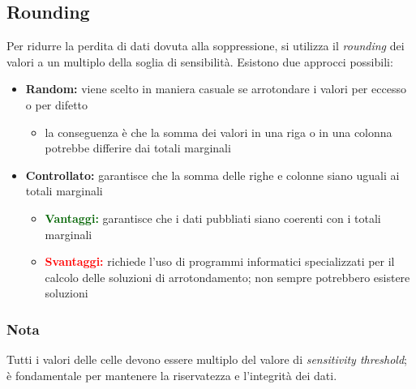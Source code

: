 \documentclass{report}
\begin{document}
\subsection{Rounding}
Per ridurre la perdita di dati dovuta alla soppressione, si utilizza il \textit{rounding} 
dei valori a un multiplo della soglia di sensibilità. Esistono due approcci possibili:
\begin{itemize}
    \item \textbf{Random:} viene scelto in maniera casuale se arrotondare i valori per eccesso o per difetto 
    \begin{itemize}
        \item la conseguenza è che la somma dei valori in una riga o in una colonna 
        potrebbe differire dai totali marginali
    \end{itemize}
    \item \textbf{Controllato:} garantisce che la somma delle righe e colonne siano uguali 
    ai totali marginali
    \begin{itemize}
        \item \textbf{\textcolor{darkgreen}{Vantaggi:}} garantisce che i dati pubbliati siano coerenti con i totali marginali
        \item \textbf{\textcolor{red}{Svantaggi:}} richiede l'uso di programmi informatici specializzati per il calcolo delle soluzioni di arrotondamento; non sempre potrebbero esistere soluzioni
    \end{itemize}
\end{itemize}

\subsubsection{Nota}
Tutti i valori delle celle devono essere multiplo del valore di \textit{sensitivity threshold}; è 
fondamentale per mantenere la riservatezza e l'integrità dei dati.
\end{document}
